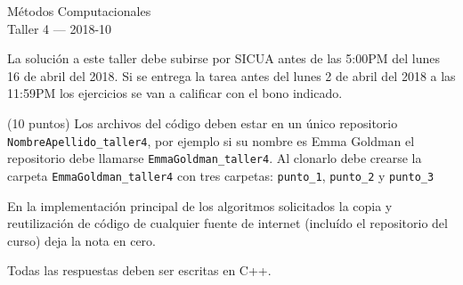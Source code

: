 \documentclass[11pt,letterpaper]{exam}
\begin{document}
\begin{center}
{\Large Métodos Computacionales} \\
Taller 4 --- 2018-10\\

\end{center}


\vspace{0.3cm}

\noindent
La solución a este taller debe subirse por SICUA antes de las 5:00PM
del lunes 16 de abril del 2018. 
Si se entrega la tarea antes del lunes 2 de abril del 2018 a las
11:59PM los ejercicios se van a calificar con el bono indicado. 
\noindent

\vspace{0.3cm}
(10 puntos) Los archivos del c\'odigo  deben estar en un \'unico repositorio 
\verb"NombreApellido_taller4", por ejemplo si su nombre es Emma
Goldman el repositorio debe llamarse \verb"EmmaGoldman_taller4".
Al clonarlo debe crearse la carpeta \verb"EmmaGoldman_taller4"
con tres carpetas: \verb"punto_1", \verb"punto_2" y \verb"punto_3"

En la implementaci\'on principal de los algoritmos solicitados la
copia y reutilizaci\'on de c\'odigo de cualquier fuente de internet
(inclu\'ido el repositorio del curso) deja la nota en cero.  

Todas las respuestas deben ser escritas en C++.
\end{document}
